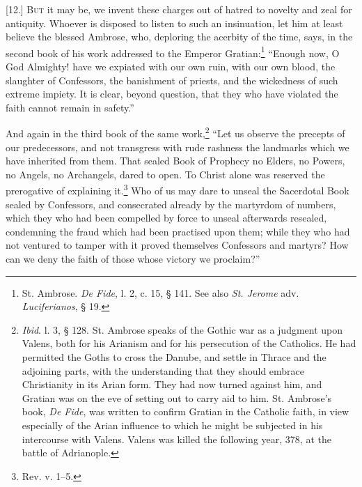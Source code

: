 
[12.] \textsc{But} it may be, we invent these charges out of hatred to novelty and zeal for antiquity. Whoever is disposed to listen to such an insinuation, let him at least believe the blessed Ambrose, who, deploring the acerbity of the time, says, in the second book of his work addressed to the Emperor Gratian:\footnote{St. Ambrose. \emph{De Fide}, l. 2, c. 15, § 141. See also \emph{St. Jerome} adv. \emph{Luciferianos}, § 19.} “Enough now, O God Almighty! have we expiated with our own ruin, with our own blood, the slaughter of Confessors, the banishment of priests, and the wickedness of such extreme impiety. It is clear, beyond question, that they who have violated the faith cannot remain in safety.”

And again in the third book of the same work,\footnote{\emph{Ibid}. l. 3, § 128. St. Ambrose speaks of the Gothic war as a judgment upon Valens, both for his Arianism and for his persecution of the Catholics. He had permitted the Goths to cross the Danube, and settle in Thrace and the adjoining parts, with the understanding that they should embrace Christianity in its Arian form. They had now turned against him, and Gratian was on the eve of setting out to carry aid to him. St. Ambrose’s book, \emph{De Fide}, was written to confirm Gratian in the Catholic faith, in view especially of the Arian influence to which he might be subjected in his intercourse with Valens. Valens was killed the following year, 378, at the battle of Adrianople.} “Let us observe the precepts of our predecessors, and not transgress with rude rashness the landmarks which we have inherited from them. That sealed Book of Prophecy no Elders, no Powers, no Angels, no Archangels, dared to open. To Christ alone was reserved the prerogative of explaining it.\footnote{Rev. v. 1–5.} Who of us may dare to unseal the Sacerdotal Book sealed by Confessors, and consecrated already by the martyrdom of numbers, which they who had been compelled by force to unseal afterwards resealed, condemning the fraud which had been practised upon them; while they who had not ventured to tamper with it proved themselves Confessors and martyrs? How can we deny the faith of those whose victory we proclaim?”

